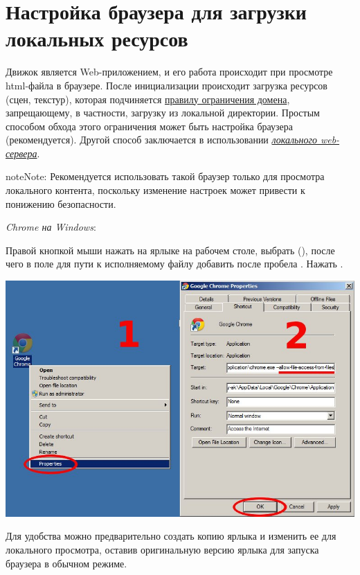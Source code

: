 \documentclass[a4paper,12pt,oneside]{sphinxmanual}
\begin{document}
\section{Настройка браузера для загрузки локальных ресурсов}
\label{problems_and_solutions:browser-for-local-loading}\label{problems_and_solutions:id3}
Движок является Web-приложением, и его работа происходит при просмотре html-файла в браузере. После инициализации происходит загрузка ресурсов (сцен, текстур), которая подчиняется \href{http://ru.wikipedia.org/wiki/Правило\_ограничения\_домена}{правилу ограничения домена}, запрещающему, в частности, загрузку из локальной директории. Простым способом обхода этого ограничения может быть настройка браузера (рекомендуется). Другой способ заключается в использовании {\hyperref[problems_and_solutions:local-web-server]{\emph{локального web-сервера}}}.

\begin{notice}{note}{Note:}
Рекомендуется использовать такой браузер только для просмотра локального контента, поскольку изменение настроек может привести к понижению безопасности.
\end{notice}

\emph{Chrome на Windows}:

Правой кнопкой мыши нажать на ярлыке на рабочем столе, выбрать  (), после чего в поле для пути к исполняемому файлу добавить после пробела . Нажать .

{\hfill\includegraphics[width=1.000\linewidth]{chrome_file_access.jpg}\hfill}

Для удобства можно предварительно создать копию ярлыка и изменить ее для локального просмотра, оставив оригинальную версию ярлыка для запуска браузера в обычном режиме.
\end{document}
